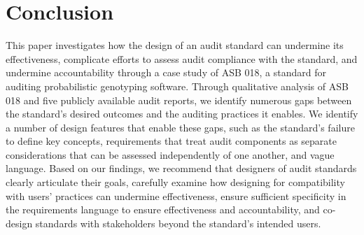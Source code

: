 \section{Conclusion}
This paper investigates how the design of an audit standard can undermine its effectiveness, complicate efforts to assess audit compliance with the standard, and undermine accountability through a case study of ASB 018, a standard for auditing probabilistic genotyping software. Through qualitative analysis of ASB 018 and five publicly available audit reports, we identify numerous gaps between the standard's desired outcomes and the auditing practices it enables. We identify a number of design features that enable these gaps, such as the standard's failure to define key concepts, requirements that treat audit components as separate considerations that can be assessed independently of one another, and vague language. Based on our findings, we recommend that designers of audit standards clearly articulate their goals, carefully examine how designing for compatibility with users' practices can undermine effectiveness, ensure sufficient specificity in the requirements language to ensure effectiveness and accountability, and co-design standards with stakeholders beyond the standard's intended users. 
